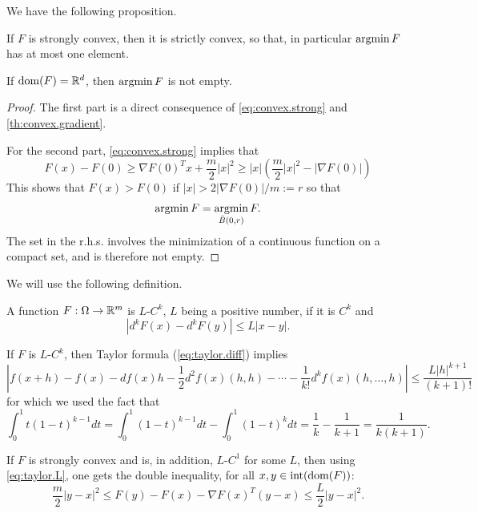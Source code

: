 We have the following proposition. 
\begin{proposition}
\label{prop:strong.strict}
If $F$ is strongly convex, then it is strictly convex, so that, in particular $\operatorname*{argmin} F$ has at most one element.

If $\mathrm{dom} (F) = {\mathbb{R}}^d$, then $\operatorname*{argmin} F$ is not empty.
\end{proposition}
\begin{proof}
The first part is  a direct consequence of  \cref{eq:convex.strong} and \cref{th:convex.gradient}. 

For the second part, \cref{eq:convex.strong} implies that 
\[
F(x) - F(0) \geq \nabla F(0)^T x + \frac{m}{2} |x|^2 \geq |x|\left(\frac{m}{2} |x|^2 - 
|\nabla F(0)|\right)
\]
This shows that $F(x) > F(0)$ if $|x| > 2|\nabla F(0)|/m := r$ so that 
\[
\operatorname*{argmin} F =  \operatorname*{argmin}_{\bar B(0, r)} F.
\]
The set in the r.h.s. involves the minimization of a continuous function on a compact set, and is therefore not empty.
\end{proof}

We will use the following definition.
\begin{definition}
\label{def:lck}
A function $F: \Omega \to {\mathbb{R}}^m$ is $L$-$C^k$, $L$ being a positive number, if it is $C^k$ and 
\[
|d^kF(x) - d^k F(y)| \leq L |x-y|.
\]
\end{definition}
If $F$ is $L$-$C^k$, then Taylor formula (\cref{eq:taylor.diff}) implies
\begin{equation}
\left| f(x+h) - f(x) - df(x) h - \frac12 d^2 f(x)(h,h) - \cdots - \frac1{k!} d^{k}f(x)(h, \ldots, h)\right| \leq 
\frac {L |h|^{k+1}}{(k+1)!}
\label{eq:taylor.L}
\end{equation}
for which we used the fact that
\[
\int_0^1 t(1-t)^{k-1}dt = \int_0^1 (1-t)^{k-1} dt - \int_0^1 (1-t)^{k}dt  = \frac1k - \frac1{k+1} = \frac{1}{k(k+1)}.
\]


If $F$ is strongly convex and is, in addition,  $L$-$C^1$ for some $L$, then using \cref{eq:taylor.L}, one gets the double inequality, for all $x,y\in \mathrm{int}(\mathrm{dom}(F))$:
\begin{equation}
\label{eq:convex.strong.L}
\frac m2 |y-x|^2 \leq F(y) - F(x) - \nabla F(x)^T (y-x) \leq \frac L2 |y-x|^2.
\end{equation} 


